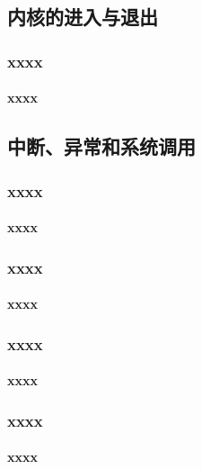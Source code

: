 % 
% 
\subsection{内核的进入与退出}
\begin{frame}
	\frametitle{xxxx}
	\framesubtitle{xxxx}
\end{frame}

% 
% 
% 

\subsection{中断、异常和系统调用}
\begin{frame}
	\frametitle{xxxx}
	\framesubtitle{xxxx}
\end{frame}

% 
% 
% 
\begin{frame}
	\frametitle{xxxx}
	\framesubtitle{xxxx}
\end{frame}
% 
\begin{frame}
	\frametitle{xxxx}
	\framesubtitle{xxxx}
\end{frame}
% 
% 
% 
\begin{frame}
	\frametitle{xxxx}
	\framesubtitle{xxxx}
\end{frame}
% 

